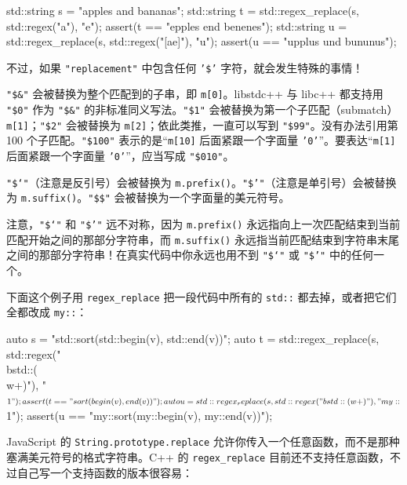 \begin{codebox}[cpp]
    std::string s = "apples and bananas";
    std::string t = std::regex_replace(s, std::regex("a"), "e");
    assert(t == "epples end benenes");
    std::string u = std::regex_replace(s, std::regex("[ae]"), "u");
    assert(u == "upplus und bununus");
\end{codebox}

不过，如果 \texttt{"replacement"} 中包含任何 \texttt{'\$'} 字符，就会发生特殊的事情！

\texttt{"\$\&"} 会被替换为整个匹配到的子串，即 \texttt{m[0]}。libstdc++ 与 libc++ 都支持用 \texttt{"\$0"} 作为 \texttt{"\$\&"} 的非标准同义写法。\texttt{"\$1"} 会被替换为第一个子匹配（submatch）\texttt{m[1]}；\texttt{"\$2"} 会被替换为 \texttt{m[2]}；依此类推，一直可以写到 \texttt{"\$99"}。没有办法引用第 100 个子匹配。\texttt{"\$100"} 表示的是“\texttt{m[10]} 后面紧跟一个字面量 \texttt{'0'}”。要表达“\texttt{m[1]} 后面紧跟一个字面量 \texttt{'0'}”，应当写成 \texttt{"\$010"}。

\texttt{"\$`"}（注意是反引号）会被替换为 \texttt{m.\allowbreak{}prefix(\allowbreak{})\allowbreak{}}。\texttt{"\$'"}（注意是单引号）会被替换为 \texttt{m.\allowbreak{}suffix(\allowbreak{})\allowbreak{}}。\texttt{"\$\$"} 会被替换为一个字面量的美元符号。

注意，\texttt{"\$`"} 和 \texttt{"\$'"} 远不对称，因为 \texttt{m.\allowbreak{}prefix(\allowbreak{})\allowbreak{}} 永远指向上一次匹配结束到当前匹配开始之间的那部分字符串，而 \texttt{m.\allowbreak{}suffix(\allowbreak{})\allowbreak{}} 永远指当前匹配结束到字符串末尾之间的那部分字符串！在真实代码中你永远也用不到 \texttt{"\$`"} 或 \texttt{"\$'"} 中的任何一个。

下面这个例子用 \texttt{regex\_\allowbreak{}replace} 把一段代码中所有的 \texttt{std::\allowbreak{}} 都去掉，或者把它们全都改成 \texttt{my::\allowbreak{}}：

\begin{codebox}[cpp]
    auto s = "std::sort(std::begin(v), std::end(v))";
    auto t = std::regex_replace(s, std::regex("\\bstd::(\\w+)"), "$1");
    assert(t == "sort(begin(v), end(v))");
    auto u = std::regex_replace(s, std::regex("\\bstd::(\\w+)"), "my::$1");
    assert(u == "my::sort(my::begin(v), my::end(v))");
\end{codebox}

JavaScript 的 \texttt{String.\allowbreak{}prototype.\allowbreak{}replace} 允许你传入一个任意函数，而不是那种塞满美元符号的格式字符串。C++ 的 \texttt{regex\_\allowbreak{}replace} 目前还不支持任意函数，不过自己写一个支持函数的版本很容易：

